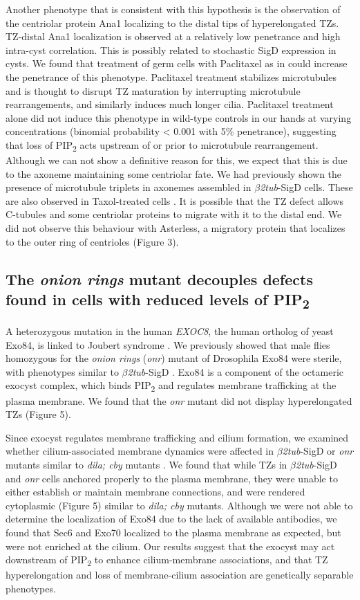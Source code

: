 \documentclass[12pt, twoside, letterpaper]{article}
\newcommand{\PIP}{PIP\textsubscript{2}}
\newcommand{\sigd}{$\beta$\textit{2tub}-SigD}
\begin{document}
Another phenotype that is consistent with this hypothesis is
the observation of the centriolar protein Ana1 localizing to the distal tips of
hyperelongated TZs.
TZ-distal Ana1 localization is observed at a relatively low penetrance
and high intra-cyst correlation.
This is possibly related to stochastic SigD expression in cysts.
We found that treatment of germ cells with Paclitaxel as in \citep{riparbelli2013unique}
could increase the penetrance of this phenotype.
Paclitaxel treatment stabilizes microtubules and is thought to disrupt TZ maturation
by interrupting microtubule rearrangements, and similarly induces much longer cilia.
Paclitaxel treatment alone did not induce this phenotype in wild-type controls in our hands
at varying concentrations (binomial probability < 0.001 with 5\% penetrance),
suggesting that loss of \PIP{} acts upstream of or prior to microtubule rearrangement.
Although we can not show a definitive reason for this, we expect that this is due to
the axoneme maintaining some centriolar fate.
We had previously shown the presence of microtubule triplets in axonemes assembled in \sigd{}
cells.
These are also observed in Taxol-treated cells \citep{riparbelli2013unique}.
It is possible that the TZ defect allows C-tubules and some centriolar proteins
to migrate with it to the distal end.
We did not observe this behaviour with Asterless,
a migratory protein that localizes to the outer
ring of centrioles (Figure 3).

\subsection{The \textit{onion rings} mutant decouples defects found in cells with reduced levels of \PIP{}}
A heterozygous mutation in the human \textit{EXOC8},
the human ortholog of yeast Exo84, is linked to
Joubert syndrome \citep{dixon2012exome}.
We previously showed that male flies homozygous for the \textit{onion rings}
(\textit{onr}) mutant of Drosophila Exo84 were sterile, with phenotypes
similar to \sigd{} \citep{wei2008depletion}.
Exo84 is a component of the octameric exocyst complex, which binds
\PIP{} and regulates membrane trafficking at the plasma membrane.
We found that the \textit{onr} mutant did not display hyperelongated TZs (Figure 5).

Since exocyst regulates membrane trafficking and cilium formation,
we examined whether cilium-associated membrane dynamics were affected in \sigd{}
or \textit{onr} mutants similar to \textit{dila; cby} mutants
\citep{vieillard2016transition}.
We found that while TZs in \sigd{} and \textit{onr} cells anchored properly
to the plasma membrane, they were unable to either establish or maintain
membrane connections, and were rendered cytoplasmic (Figure 5) similar to
\textit{dila; cby} mutants.
Although we were not able to determine the localization of Exo84 due to the
lack of available antibodies,
we found that Sec6 and Exo70 localized to the plasma membrane as expected,
but were not enriched at the cilium.
Our results suggest that the exocyst may act downstream of \PIP{} to
enhance cilium-membrane associations, and that TZ hyperelongation and loss of
membrane-cilium association are genetically separable phenotypes.
\end{document}
